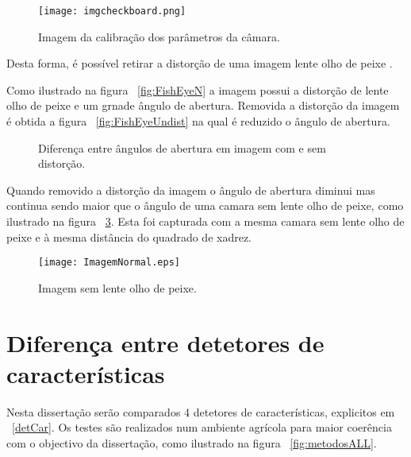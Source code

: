 \begin{figure}[h!]  %
	\centering
	\texttt{[image: imgcheckboard.png]} 
	\caption{Imagem da calibração dos parâmetros da câmara.}
	\label{fig:imgcheckboard}  %
\end{figure}


Desta forma, é possível retirar a distorção de uma imagem lente olho de peixe . 



Como ilustrado na figura ~\ref{fig:FishEyeN} a imagem possui a distorção de lente olho de peixe e um grnade ângulo de abertura. Removida a distorção da imagem é obtida a figura ~\ref{fig:FishEyeUndist} na qual é reduzido o ângulo de abertura.

\begin{figure}[h!]
	\centering
	\qquad
	\caption{Diferença entre ângulos de abertura em imagem com e sem distorção.}\label{fig:FisheEye}
\end{figure}


Quando removido a distorção da imagem o ângulo de abertura diminui mas continua sendo maior que o ângulo de uma camara sem lente olho de peixe, como ilustrado na figura ~\ref{fig:ImageNorm}. Esta foi capturada com a mesma camara sem lente olho de peixe e à mesma distância do quadrado de xadrez.

\begin{figure}[h!]
	\centering
	\label{fig:ImageNorm}
	\texttt{[image: ImagemNormal.eps]}
	\caption{Imagem sem lente olho de peixe.}
\end{figure}







\section{Diferença entre detetores de características}

Nesta dissertação serão comparados 4 detetores de características, explicitos em  ~\ref{detCar}. Os testes são realizados num ambiente agrícola para maior coerência com o objectivo da dissertação, como ilustrado na figura ~\ref{fig:metodosALL}.




